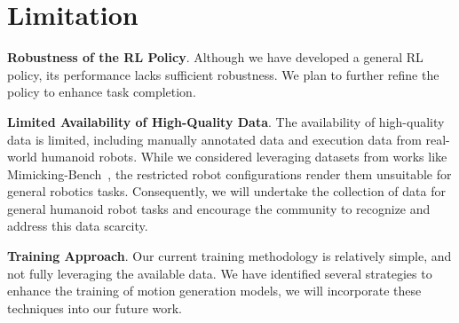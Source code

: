 \section{Limitation}

\textbf{Robustness of the RL Policy}. Although we have developed a general RL policy, its performance lacks sufficient robustness. We plan to further refine the policy to enhance task completion.

\textbf{Limited Availability of High-Quality Data}. The availability of high-quality data is limited, including manually annotated data and execution data from real-world humanoid robots. While we considered leveraging datasets from works like Mimicking-Bench~\cite{liu2024mimicking}, the restricted robot configurations render them unsuitable for general robotics tasks. Consequently, we will undertake the collection of data for general humanoid robot tasks and encourage the community to recognize and address this data scarcity.

\textbf{Training Approach}. Our current training methodology is relatively simple, and not fully leveraging the available data. We have identified several strategies to enhance the training of motion generation models, we will incorporate these techniques into our future work.